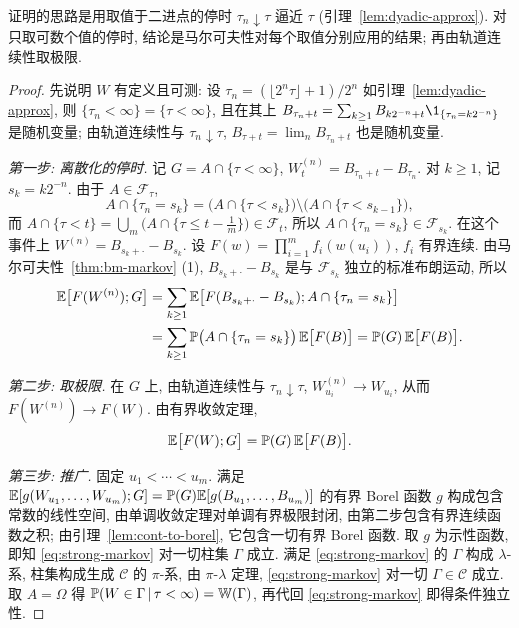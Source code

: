 证明的思路是用取值于二进点的停时 $\tau_n\downarrow\tau$ 逼近 $\tau$ (引理~\ref{lem:dyadic-approx}). 对只取可数个值的停时, 结论是马尔可夫性对每个取值分别应用的结果; 再由轨道连续性取极限.

\begin{proof}
先说明 $W$ 有定义且可测: 设 $\tau_n=(\lfloor2^n\tau\rfloor+1)/2^n$ 如引理~\ref{lem:dyadic-approx}, 则 $\{\tau_n<\infty\}=\{\tau<\infty\}$, 且在其上 $B_{\tau_n+t}=\sum_{k\ge1}B_{k2^{-n}+t}\1_{\{\tau_n=k2^{-n}\}}$ 是随机变量; 由轨道连续性与 $\tau_n\downarrow\tau$, $B_{\tau+t}=\lim_nB_{\tau_n+t}$ 也是随机变量.

\emph{第一步: 离散化的停时.} 记 $G=A\cap\{\tau<\infty\}$, $W^{(n)}_t=B_{\tau_n+t}-B_{\tau_n}$. 对 $k\ge1$, 记 $s_k=k2^{-n}$. 由于 $A\in\mathcal{F}_\tau$,
\[
A\cap\{\tau_n=s_k\}=\big(A\cap\{\tau<s_k\}\big)\setminus\big(A\cap\{\tau<s_{k-1}\}\big),
\]
而 $A\cap\{\tau<t\}=\bigcup_m\big(A\cap\{\tau\le t-\frac{1}{m}\}\big)\in\mathcal{F}_t$, 所以 $A\cap\{\tau_n=s_k\}\in\mathcal{F}_{s_k}$. 在这个事件上 $W^{(n)}=B_{s_k+\cdot}-B_{s_k}$. 设 $F(w)=\prod_{i=1}^mf_i(w(u_i))$, $f_i$ 有界连续. 由马尔可夫性~\ref{thm:bm-markov} (1), $B_{s_k+\cdot}-B_{s_k}$ 是与 $\mathcal{F}_{s_k}$ 独立的标准布朗运动, 所以
\begin{align*}
\E\big[F(W^{(n)});G\big]&=\sum_{k\ge1}\E\big[F(B_{s_k+\cdot}-B_{s_k});A\cap\{\tau_n=s_k\}\big]\\
&=\sum_{k\ge1}\P\big(A\cap\{\tau_n=s_k\}\big)\,\E\big[F(B)\big]=\P(G)\,\E\big[F(B)\big].
\end{align*}

\emph{第二步: 取极限.} 在 $G$ 上, 由轨道连续性与 $\tau_n\downarrow\tau$, $W^{(n)}_{u_i}\to W_{u_i}$, 从而 $F(W^{(n)})\to F(W)$. 由有界收敛定理,
\[
\E\big[F(W);G\big]=\P(G)\,\E\big[F(B)\big].
\]

\emph{第三步: 推广.} 固定 $u_1<\cdots<u_m$. 满足 $\E[g(W_{u_1},\dots,W_{u_m});G]=\P(G)\E[g(B_{u_1},\dots,B_{u_m})]$ 的有界 Borel 函数 $g$ 构成包含常数的线性空间, 由单调收敛定理对单调有界极限封闭, 由第二步包含有界连续函数之积; 由引理~\ref{lem:cont-to-borel}, 它包含一切有界 Borel 函数. 取 $g$ 为示性函数, 即知 \eqref{eq:strong-markov} 对一切柱集 $\Gamma$ 成立. 满足 \eqref{eq:strong-markov} 的 $\Gamma$ 构成 $\lambda$-系, 柱集构成生成 $\mathcal{C}$ 的 $\pi$-系, 由 $\pi$-$\lambda$ 定理, \eqref{eq:strong-markov} 对一切 $\Gamma\in\mathcal{C}$ 成立. 取 $A=\Omega$ 得 $\P(W\in\Gamma\,|\,\tau<\infty)=\mathbb{W}(\Gamma)$, 再代回 \eqref{eq:strong-markov} 即得条件独立性.
\end{proof}

